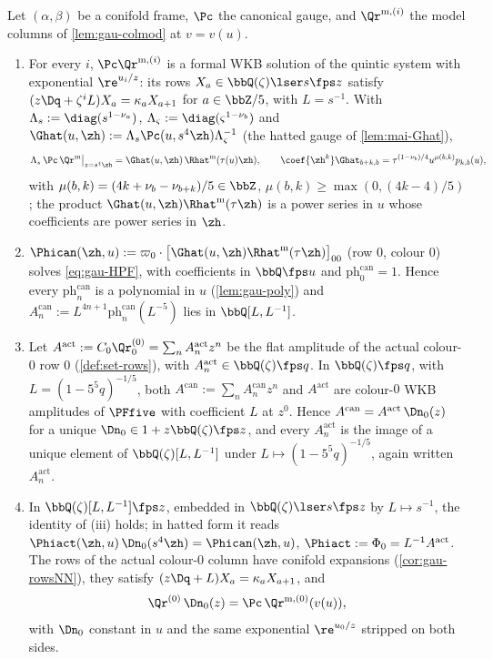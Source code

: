 
\begin{thm}
\label{thm:gau-R0}
Let $(\alpha,\beta)$ be a conifold frame, $\Pc$ the canonical gauge, and $\Qr^{\mathrm m,(i)}$ the model columns of \cref{lem:gau-colmod} at $v=v(u)$.
\begin{enumerate}
\item For every $i$, $\Pc\Qr^{\mathrm m,(i)}$ is a formal WKB solution of the quintic system with exponential $\re^{u_i/z}$: its rows $X_a\in\bbQ(\zeta)\lser s\fps z$ satisfy $(z\Dq+\zeta^iL)X_a=\kappa_aX_{a+1}$ for $a\in\bbZ/5$, with $L=s^{-1}$. With $\Lambda_s:=\diag(s^{1-\nu_a})$, $\Lambda_\varsigma:=\diag(\varsigma^{1-\nu_b})$ and $\Ghat(u,\zh):=\Lambda_s\Pc(u,s^4\zh)\Lambda_\varsigma^{-1}$ (the hatted gauge of \cref{lem:mai-Ghat}),
\[
\Lambda_s\,\Pc\,\Qr^{\mathrm m}\big|_{z=s^4\zh}=\Ghat(u,\zh)\,\Rhat^{\mathrm m}(\tau(u)\zh),\qquad \coef{\zh^k}\Ghat_{b+k,b}=\tau^{(1-\nu_b)/4}u^{\mu(b,k)}p_{k,b}(u),
\]
with $\mu(b,k)=(4k+\nu_b-\nu_{b+k})/5\in\bbZ$, $\mu(b,k)\geq\max(0,(4k-4)/5)$; the product $\Ghat(u,\zh)\Rhat^{\mathrm m}(\tau\zh)$ is a power series in $u$ whose coefficients are power series in $\zh$.
\item $\Phican(\zh,u):=\varpi_0\cdot\bigl[\Ghat(u,\zh)\Rhat^{\mathrm m}(\tau\zh)\bigr]_{00}$ (row $0$, colour $0$) solves \eqref{eq:gau-HPF}, with coefficients in $\bbQ\fps u$ and $\mathrm{ph}^{\mathrm{can}}_0=1$. Hence every $\mathrm{ph}^{\mathrm{can}}_n$ is a polynomial in $u$ (\cref{lem:gau-poly}) and $A^{\mathrm{can}}_n:=L^{4n+1}\mathrm{ph}^{\mathrm{can}}_n(L^{-5})$ lies in $\bbQ[L,L^{-1}]$.
\item Let $A^{\mathrm{act}}:=C_0\Qr^{(0)}_0=\sum_nA^{\mathrm{act}}_nz^n$ be the flat amplitude of the actual colour-$0$ row $0$ (\cref{def:set-rows}), with $A^{\mathrm{act}}_n\in\bbQ(\zeta)\fps q$. In $\bbQ(\zeta)\fps q$, with $L=(1-5^5q)^{-1/5}$, both $A^{\mathrm{can}}:=\sum_nA^{\mathrm{can}}_nz^n$ and $A^{\mathrm{act}}$ are colour-$0$ WKB amplitudes of $\PFfive$ with coefficient $L$ at $z^0$. Hence $A^{\mathrm{can}}=A^{\mathrm{act}}\,\Dn_0(z)$ for a unique $\Dn_0\in1+z\bbQ(\zeta)\fps z$, and every $A^{\mathrm{act}}_n$ is the image of a unique element of $\bbQ(\zeta)[L,L^{-1}]$ under $L\mapsto(1-5^5q)^{-1/5}$, again written $A^{\mathrm{act}}_n$.
\item In $\bbQ(\zeta)[L,L^{-1}]\fps z$, embedded in $\bbQ(\zeta)\lser s\fps z$ by $L\mapsto s^{-1}$, the identity of (iii) holds; in hatted form it reads $\Phiact(\zh,u)\,\Dn_0(s^4\zh)=\Phican(\zh,u)$, $\Phiact:=\Phi_0=L^{-1}A^{\mathrm{act}}$. The rows of the actual colour-$0$ column have conifold expansions (\cref{cor:gau-rowsNN}), they satisfy $(z\Dq+L)X_a=\kappa_aX_{a+1}$, and
\begin{equation}
\label{eq:gau-R0zero}
\Qr^{(0)}\,\Dn_0(z)=\Pc\,\Qr^{\mathrm m,(0)}(v(u)),
\end{equation}
with $\Dn_0$ constant in $u$ and the same exponential $\re^{u_0/z}$ stripped on both sides.
\end{enumerate}
\end{thm}

